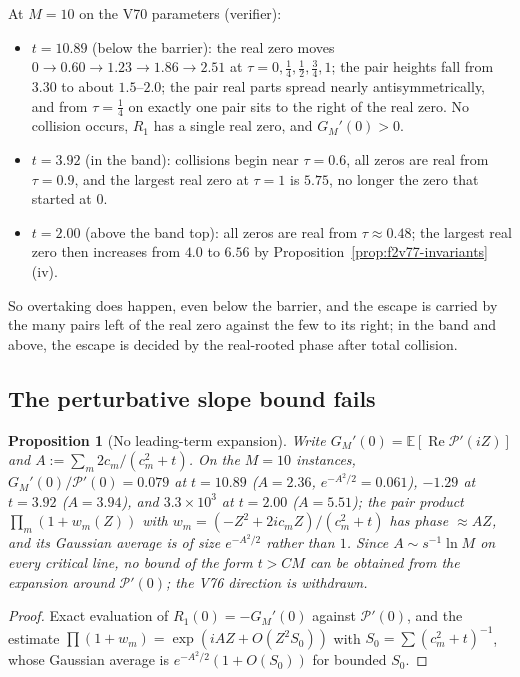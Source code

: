 \documentclass[11pt]{article}
\newtheorem{proposition}[theorem]{Proposition}
\theoremstyle{definition}
\theoremstyle{remark}
\begin{document}
At \(M=10\) on the V70 parameters (verifier):
\begin{itemize}
\item \(t=10.89\) (below the barrier): the real zero moves
\(0\to0.60\to1.23\to1.86\to2.51\) at \(\tau=0,\tfrac14,\tfrac12,\tfrac34,1\);
the pair heights fall from \(3.30\) to about \(1.5\)--\(2.0\); the pair
real parts spread nearly antisymmetrically, and from \(\tau=\tfrac14\) on
exactly one pair sits to the right of the real zero.  No collision
occurs, \(R_1\) has a single real zero, and \(G_M'(0)>0\).
\item \(t=3.92\) (in the band): collisions begin near \(\tau=0.6\), all
zeros are real from \(\tau=0.9\), and the largest real zero at
\(\tau=1\) is \(5.75\), no longer the zero that started at \(0\).
\item \(t=2.00\) (above the band top): all zeros are real from
\(\tau\approx0.48\); the largest real zero then increases from \(4.0\) to
\(6.56\) by Proposition~\ref{prop:f2v77-invariants}(iv).
\end{itemize}
So overtaking does happen, even below the barrier, and the escape is
carried by the many pairs left of the real zero against the few to its
right; in the band and above, the escape is decided by the real-rooted
phase after total collision.

\subsection{The perturbative slope bound fails}

\begin{proposition}[No leading-term expansion]
\label{prop:f2v77-noleading}
Write \(G_M'(0)=\mathbb E[\operatorname{Re}\mathcal P'(iZ)]\) and
\(A:=\sum_m2c_m/(c_m^2+t)\).  On the \(M=10\) instances,
\(G_M'(0)/\mathcal P'(0)=0.079\) at \(t=10.89\) (\(A=2.36\),
\(e^{-A^2/2}=0.061\)), \(-1.29\) at \(t=3.92\) (\(A=3.94\)), and
\(3.3\times10^3\) at \(t=2.00\) (\(A=5.51\)); the pair product
\(\prod_m(1+w_m(Z))\) with \(w_m=(-Z^2+2ic_mZ)/(c_m^2+t)\) has phase
\(\approx AZ\), and its Gaussian average is of size \(e^{-A^2/2}\) rather
than \(1\).  Since \(A\sim s^{-1}\ln M\) on every critical line, no
bound of the form \(t>CM\) can be obtained from the expansion around
\(\mathcal P'(0)\); the V76 direction is withdrawn.
\end{proposition}

\begin{proof}
Exact evaluation of \(R_1(0)=-G_M'(0)\) against \(\mathcal P'(0)\), and
the estimate \(\prod(1+w_m)=\exp(iAZ+O(Z^2S_0))\) with
\(S_0=\sum(c_m^2+t)^{-1}\), whose Gaussian average is
\(e^{-A^2/2}(1+O(S_0))\) for bounded \(S_0\).
\end{proof}
\end{document}
